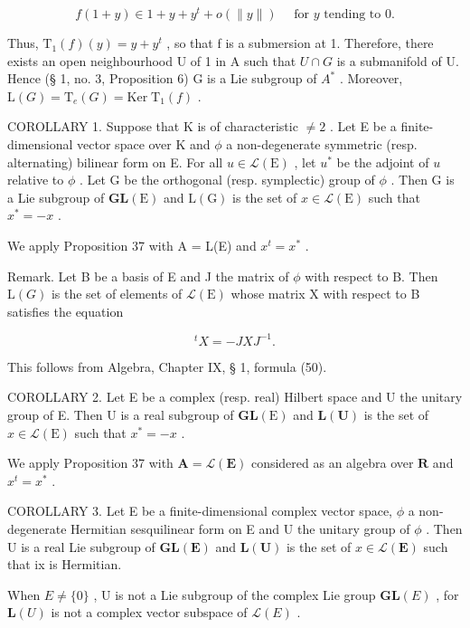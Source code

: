 \[
f (1 + y) \in 1 + y + y ^ {t} + o (\| y \|) \quad \text { for   } y \text {   tending   to   } 0.
\]

Thus, \(\mathrm{T}_{1}(f)(y)=y+y^{t}\) , so that f is a submersion at 1. Therefore, there exists an open neighbourhood U of 1 in A such that \(U\cap G\) is a submanifold of U. Hence (§ 1, no. 3, Proposition 6) G is a Lie subgroup of \(A^{*}\) . Moreover, \(\mathrm{L}(G)=\mathrm{T}_{e}(G)=\mathrm{Ker}\;\mathrm{T}_{1}(f)\) .

COROLLARY 1. Suppose that K is of characteristic \(\neq 2\) . Let E be a finite-dimensional vector space over K and \(\phi\) a non-degenerate symmetric (resp. alternating) bilinear form on E. For all \(u \in \mathcal{L}(\mathrm{E})\) , let \(u^*\) be the adjoint of \(u\) relative to \(\phi\) . Let G be the orthogonal (resp. symplectic) group of \(\phi\) . Then G is a Lie subgroup of \(\mathbf{GL}(\mathrm{E})\) and \(\mathrm{L}(\mathrm{G})\) is the set of \(x \in \mathcal{L}(\mathrm{E})\) such that \(x^* = -x\) .

We apply Proposition 37 with A = L(E) and \(x^{t} = x^{*}\) .

Remark. Let B be a basis of E and J the matrix of \(\phi\) with respect to B. Then \(\mathrm{L}(G)\) is the set of elements of \(\mathcal{L}(\mathrm{E})\) whose matrix X with respect to B satisfies the equation

\[
{ } ^ { t } X = - J X J ^ { - 1 } .
\]

This follows from Algebra, Chapter IX, § 1, formula (50).

COROLLARY 2. Let E be a complex (resp. real) Hilbert space and U the unitary group of E. Then U is a real subgroup of \(\mathbf{GL}(\mathrm{E})\) and \(\mathbf{L}(\mathbf{U})\) is the set of \(x \in \mathcal{L}(\mathrm{E})\) such that \(x^{*} = -x\) .

We apply Proposition 37 with \(\mathbf{A} = \mathcal{L}(\mathbf{E})\) considered as an algebra over \(\mathbf{R}\) and \(x^t = x^*\) .

COROLLARY 3. Let E be a finite-dimensional complex vector space, \(\phi\) a non-degenerate Hermitian sesquilinear form on E and U the unitary group of \(\phi\) . Then U is a real Lie subgroup of \(\mathbf{GL}(\mathbf{E})\) and \(\mathbf{L}(\mathbf{U})\) is the set of \(x \in \mathcal{L}(\mathbf{E})\) such that ix is Hermitian.

When \(E \neq \{0\}\) , U is not a Lie subgroup of the complex Lie group \(\mathbf{GL}(E)\) , for \(\mathbf{L}(U)\) is not a complex vector subspace of \(\mathcal{L}(E)\) .

